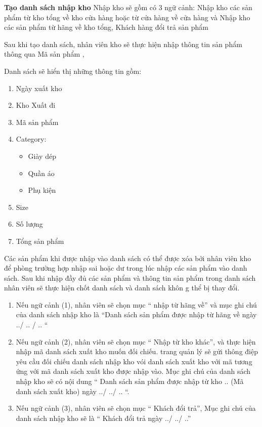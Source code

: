 \documentclass{article}
\begin{document}
\fontsize{14}{20}\selectfont\textbf{Tạo danh sách nhập kho}
Nhập kho sẽ gồm có 3 ngữ cảnh: Nhập kho các sản phẩm từ kho tổng về kho cửa hàng hoặc từ cửa hàng về cửa hàng và Nhập kho các sản phẩm từ hãng về kho tổng, Khách hàng đổi trả sản phẩm
 
Sau khi tạo danh sách, nhân viên kho sẽ thực hiện nhập thông tin sản phẩm thông qua Mã sản phẩm , 

Danh sách sẽ hiển thị những thông tin gồm: 

\begin{enumerate}
        \item Ngày xuất kho
        \item Kho Xuất đi
        \item Mã sản phẩm
        \item Category:
            \begin{itemize}
                \item Giày dép
                \item Quần áo
                \item Phụ kiện
            \end{itemize}
        \item Size
        \item Số lượng
        \item Tổng sản phẩm
\end{enumerate}
Các sản phẩm khi được nhập vào danh sách có thể được xóa bởi nhân viên kho để phòng trường hợp nhập sai hoặc dư trong lúc nhập các sản phẩm vào danh sách.
Sau khi nhập đầy đủ các sản phẩm và thông tin sản phẩm trong danh sách nhân viên sẽ thực hiện chốt danh sách và danh sách khôn g thể bị thay đổi. 

\begin{enumerate}
    \item 	Nếu ngữ cảnh (1), nhân viên sẽ chọn mục “ nhập từ hãng về” và  mục ghi chú của danh sách nhập kho là “Danh sách sản phẩm được nhập từ hãng về ngày ../ .. /  .. “ 
    \item 	Nếu ngữ cảnh (2), nhân viên sẽ chọn mục “ Nhập từ kho khác”, và thực hiện nhập mã danh sách xuất kho muốn đối chiếu. trang quản lý sẽ gửi thông điệp yêu cầu đối chiếu danh sách nhập kho vói danh sách xuất kho với mã tương ứng với mã danh sách xuất kho được nhập vào. Mục ghi chú của danh sách nhập kho sẽ có nội dung “  Danh sách sản phẩm được nhập từ kho .. (Mã danh sách xuất kho) ngày ../  ../  .. “.
    \item 	Nếu ngữ cảnh (3), nhân viên sẽ chọn mục “ Khách đổi trả”, Mục ghi chú của danh sách nhập kho sẽ là “ Khách đổi trả ngày ../ ../ ..”
\end{enumerate}
\end{document}
